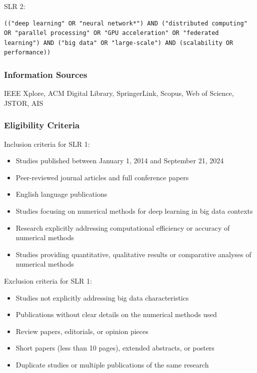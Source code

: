 \documentclass[acmsmall]{acmart}
\begin{document}
SLR 2:
\begin{lstlisting}[caption={SLR 2},label={lst:slr_2}]
    (("deep learning" OR "neural network*") AND ("distributed computing" OR "parallel processing" OR "GPU acceleration" OR "federated learning") AND ("big data" OR "large-scale") AND (scalability OR performance))
\end{lstlisting}

\subsubsection{Information Sources}\label{subsubsec:phase-1-planning-and-protocol-development:information-sources}
IEEE Xplore, ACM Digital Library, SpringerLink, Scopus, Web of Science, JSTOR, AIS

\subsubsection{Eligibility Criteria}\label{subsubsec:phase-1-planning-and-protocol-development:eligibility-criteria}
Inclusion criteria for SLR 1:
\begin{itemize}
    \item Studies published between January 1, 2014 and September 21, 2024
    \item Peer-reviewed journal articles and full conference papers
    \item English language publications
    \item Studies focusing on numerical methods for deep learning in big data contexts
    \item Research explicitly addressing computational efficiency or accuracy of numerical methods
    \item Studies providing quantitative, qualitative results or comparative analyses of numerical methods
\end{itemize}

Exclusion criteria for SLR 1:
\begin{itemize}
    \item Studies not explicitly addressing big data characteristics
    \item Publications without clear details on the numerical methods used
    \item Review papers, editorials, or opinion pieces
    \item Short papers (less than 10 pages), extended abstracts, or posters
    \item Duplicate studies or multiple publications of the same research
\end{itemize}
\end{document}
